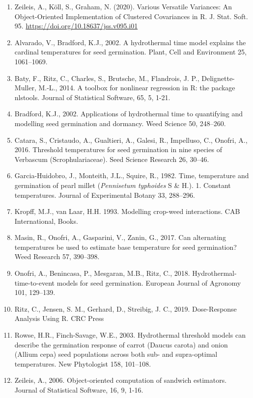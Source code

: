 \documentclass[
]{book}
\begin{document}
\begin{enumerate}
\item
  Zeileis, A., Köll, S., Graham, N. (2020). Various Versatile Variances: An Object-Oriented Implementation of Clustered Covariances in R. J. Stat. Soft. 95. \url{https://doi.org/10.18637/jss.v095.i01}
\item
  Alvarado, V., Bradford, K.J., 2002. A hydrothermal time model explains the cardinal temperatures for seed germination. Plant, Cell and Environment 25, 1061--1069.
\item
  Baty, F., Ritz, C., Charles, S., Brutsche, M., Flandrois, J. P., Delignette-Muller, M.-L., 2014. A toolbox for nonlinear regression in R: the package nlstools. Journal of Statistical Software, 65, 5, 1-21.
\item
  Bradford, K.J., 2002. Applications of hydrothermal time to quantifying and modelling seed germination and dormancy. Weed Science 50, 248--260.
\item
  Catara, S., Cristaudo, A., Gualtieri, A., Galesi, R., Impelluso, C., Onofri, A., 2016. Threshold temperatures for seed germination in nine species of Verbascum (Scrophulariaceae). Seed Science Research 26, 30--46.
\item
  Garcia-Huidobro, J., Monteith, J.L., Squire, R., 1982. Time, temperature and germination of pearl millet (\emph{Pennisetum typhoides} S \& H.). 1. Constant temperatures. Journal of Experimental Botany 33, 288--296.
\item
  Kropff, M.J., van Laar, H.H. 1993. Modelling crop-weed interactions. CAB International, Books.
\item
  Masin, R., Onofri, A., Gasparini, V., Zanin, G., 2017. Can alternating temperatures be used to estimate base temperature for seed germination? Weed Research 57, 390--398.
\item
  Onofri, A., Benincasa, P., Mesgaran, M.B., Ritz, C., 2018. Hydrothermal-time-to-event models for seed germination. European Journal of Agronomy 101, 129--139.
\item
  Ritz, C., Jensen, S. M., Gerhard, D., Streibig, J. C., 2019. Dose-Response Analysis Using R. CRC Press
\item
  Rowse, H.R., Finch-Savage, W.E., 2003. Hydrothermal threshold models can describe the germination response of carrot (Daucus carota) and onion (Allium cepa) seed populations across both sub- and supra-optimal temperatures. New Phytologist 158, 101--108.
\item
  Zeileis, A., 2006. Object-oriented computation of sandwich estimators. Journal of Statistical Software, 16, 9, 1-16.
\end{enumerate}

  
\end{document}
